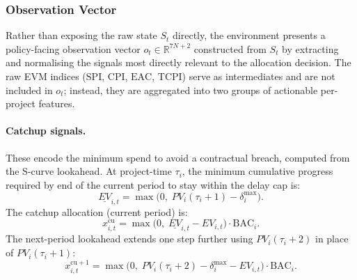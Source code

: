 \subsubsection{Observation Vector}
\label{subsubsec:obs}

Rather than exposing the raw state $S_t$ directly, the environment
presents a policy-facing observation vector $o_t \in \mathbb{R}^{7N+2}$
constructed from $S_t$ by extracting and normalising the signals most
directly relevant to the allocation decision. The raw EVM indices
($\mathrm{SPI}$, $\mathrm{CPI}$, $\mathrm{EAC}$, $\mathrm{TCPI}$)
serve as intermediates and are not included in $o_t$; instead, they
are aggregated into two groups of actionable per-project features.

\paragraph{Catchup signals.} These encode the minimum spend to avoid
a contractual breach, computed from the S-curve lookahead. At
project-time $\tau_i$, the minimum cumulative progress required by
end of the current period to stay within the delay cap is:
\begin{equation}
  \underline{EV}_{i,t}
    = \max\!\bigl(0,\; PV_i(\tau_i + 1) - \delta^{\max}_i\bigr).
  \label{eq:min_prog}
\end{equation}
The catchup allocation (current period) is:
\begin{equation}
  x^{\mathrm{cu}}_{i,t}
    = \max\!\bigl(0,\; \underline{EV}_{i,t} - EV_{i,t}\bigr)
      \cdot \mathrm{BAC}_i.
  \label{eq:catchup}
\end{equation}
The next-period lookahead extends one step further using
$PV_i(\tau_i + 2)$ in place of $PV_i(\tau_i + 1)$:
\begin{equation}
  x^{\mathrm{cu}+1}_{i,t}
    = \max\!\bigl(0,\; PV_i(\tau_i + 2) - \delta^{\max}_i
      - EV_{i,t}\bigr) \cdot \mathrm{BAC}_i.
  \label{eq:catchup_next}
\end{equation}


